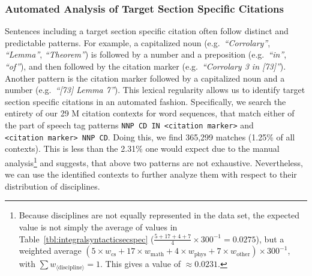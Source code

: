 \subsubsection{Automated Analysis of Target Section Specific Citations}\label{sec:specrevautoeval}
Sentences including a target section specific citation often follow distinct and predictable patterns. For example, a capitalized noun (e.g.\ \emph{``Corrolary''}, \emph{``Lemma''}, \emph{``Theorem''}) is followed by a number and a preposition (e.g.\ \emph{``in''},  \emph{``of''}), and then followed by the citation marker (e.g.\ \emph{``Corrolary 3 in [73]''}). Another pattern is the citation marker followed by a capitalized noun and a number (e.g.\ \emph{``[73] Lemma 7''}). This lexical regularity allows us to identify target section specific citations in an automated fashion. Specifically, we search the entirety of our 29 M citation contexts for word sequences, that match either of the part of speech tag patterns \texttt{NNP~CD~IN~<citation~marker>} and \texttt{<citation~marker>~NNP~CD}. Doing this, we find 365,299 matches (1.25\% of all contexts). This is less than the 2.31\% one would expect due to the manual analysis\footnote{Because disciplines are not equally represented in the data set, the expected value is not simply the average of values in Table~\ref{tbl:integralsyntacticsecspec} ($\frac{5+17+4+7}{4}\times 300^{-1}=0.0275$), but a weighted average $(5\times w_\text{cs}+17\times w_\text{math}+4\times w_\text{phys}+7\times w_\text{other})\times 300^{-1}$, with $\sum w_{\langle\text{discipline}\rangle}=1$. This gives a value of $\approx 0.0231$.} and suggests, that above two patterns are not exhaustive. Nevertheless, we can use the identified contexts to further analyze them with respect to their distribution of disciplines.

%
%
%
%

